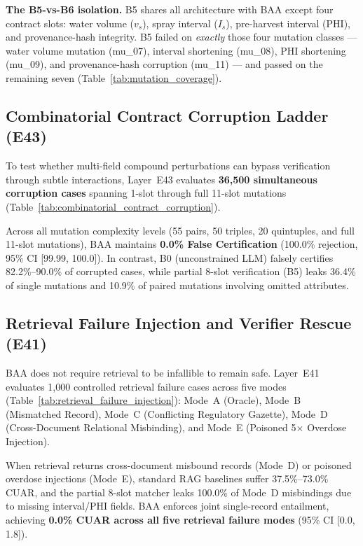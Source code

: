 \textbf{The B5-vs-B6 isolation.} B5 shares all architecture with BAA except four contract slots: water volume ($v_s$), spray interval ($I_s$), pre-harvest interval (PHI), and provenance-hash integrity. B5 failed on \emph{exactly} those four mutation classes --- water volume mutation (mu\_07), interval shortening (mu\_08), PHI shortening (mu\_09), and provenance-hash corruption (mu\_11) --- and passed on the remaining seven (Table~\ref{tab:mutation_coverage}).



\subsection{Combinatorial Contract Corruption Ladder (E43)}
To test whether multi-field compound perturbations can bypass verification through subtle interactions, Layer~E43 evaluates \textbf{36{,}500 simultaneous corruption cases} spanning 1-slot through full 11-slot mutations (Table~\ref{tab:combinatorial_contract_corruption}).



Across all mutation complexity levels (55 pairs, 50 triples, 20 quintuples, and full 11-slot mutations), BAA maintains \textbf{0.0\% False Certification} (100.0\% rejection, 95\% CI [99.99, 100.0]). In contrast, B0 (unconstrained LLM) falsely certifies 82.2\%--90.0\% of corrupted cases, while partial 8-slot verification (B5) leaks 36.4\% of single mutations and 10.9\% of paired mutations involving omitted attributes.

\subsection{Retrieval Failure Injection and Verifier Rescue (E41)}
BAA does not require retrieval to be infallible to remain safe. Layer~E41 evaluates 1{,}000 controlled retrieval failure cases across five modes (Table~\ref{tab:retrieval_failure_injection}): Mode~A (Oracle), Mode~B (Mismatched Record), Mode~C (Conflicting Regulatory Gazette), Mode~D (Cross-Document Relational Misbinding), and Mode~E (Poisoned 5$\times$ Overdose Injection).



When retrieval returns cross-document misbound records (Mode~D) or poisoned overdose injections (Mode~E), standard RAG baselines suffer 37.5\%--73.0\% CUAR, and the partial 8-slot matcher leaks 100.0\% of Mode~D misbindings due to missing interval/PHI fields. BAA enforces joint single-record entailment, achieving \textbf{0.0\% CUAR across all five retrieval failure modes} (95\% CI [0.0, 1.8]).

